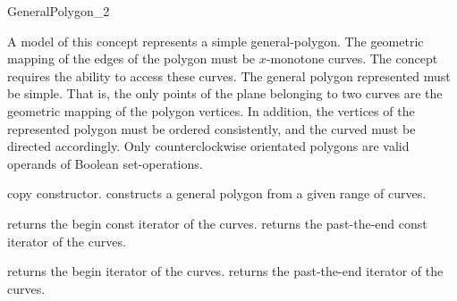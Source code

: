 \ccRefPageBegin

\begin{ccRefConcept}{GeneralPolygon_2}

\ccTypes


\ccGlue
{}

\ccDefinition
A model of this concept represents a simple general-polygon. The
geometric mapping of the edges of the polygon must be $x$-monotone curves.
The concept requires the ability to access these curves. 
The general polygon represented must be simple. That is, the
only points of the plane belonging to two curves are the geometric mapping
of the polygon vertices. In addition, the vertices of the represented 
polygon must be ordered consistently, and the curved must be directed 
accordingly. Only counterclockwise orientated polygons are valid operands
of Boolean set-operations.

\ccCreation
{}

\ccThreeToTwo

\ccGlue
{}
{copy constructor.}
\ccGlue
{}
\ccGlue
{}
{constructs a general polygon from a given range of curves.}

\ccAccessFunctions

{returns the begin const iterator of the curves.}
\ccGlue
{} 
{returns the past-the-end const iterator of the curves.}

{returns the begin iterator of the curves.}
\ccGlue
{} 
{returns the past-the-end iterator of the curves.}


\end{ccRefConcept}
